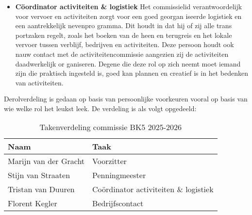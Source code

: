 \begin{itemize}
	\vspace{0.5cm}
	
	\item \textbf{Cöordinator activiteiten \& logistiek} Het commissielid verantwoordelijk voor vervoer
	en activiteiten zorgt voor een goed georgan
	iseerde logistiek en een aantrekkelijk nevenpro
	gramma. Dit houdt in dat hij of zij alle trans
	portzaken regelt, zoals het boeken van de heen
	en terugreis en het lokale vervoer tussen verblijf,
	bedrijven en activiteiten. Deze persoon houdt
	ook nauw contact met de activiteitencommissie
	aangezien zij de activiteiten daadwerkelijk or
	ganiseren. Degene die deze rol op zich neemt
	moet iemand zijn die praktisch ingesteld is, goed
	kan plannen en creatief is in het bedenken van
	activiteiten.
\end{itemize}

Derolverdeling is gedaan op basis van persoonlijke
voorkeuren vooral op basis van wie welke rol het
leukst leek. De verdeling is als volgt opgedeeld:

\begin{table}[h!]
	\centering
	\caption{Takenverdeling commissie BK5 2025-2026}
	\label{tab:takenverdeling}
	\begin{tabular}{|l|l|}
		\hline
		\textbf{Naam} & \textbf{Taak} \\
		\hline
		Marijn van der Gracht & Voorzitter \\
		\hline
		Stijn van Straaten & Penningmeester \\
		\hline
		Tristan van Duuren & Coördinator activiteiten \& logistiek \\
		\hline
		Florent Kegler & Bedrijfscontact \\
		\hline
	\end{tabular}
\end{table}